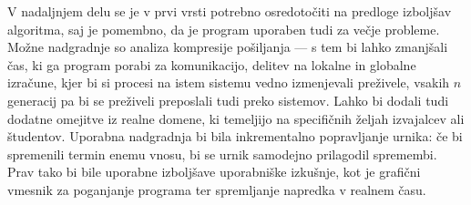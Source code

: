 \documentclass[a4paper,12pt]{book}
\begin{document}
V nadaljnjem delu se je v prvi vrsti potrebno osredotočiti na predloge izboljšav algoritma, saj je pomembno, da je program uporaben tudi za večje probleme. Možne nadgradnje so analiza kompresije pošiljanja --- s tem bi lahko zmanjšali čas, ki ga program porabi za komunikacijo, delitev na lokalne in globalne izračune, kjer bi si procesi na istem sistemu vedno izmenjevali preživele, vsakih $n$ generacij pa bi se preživeli preposlali tudi preko sistemov. Lahko bi dodali tudi dodatne omejitve iz realne domene, ki temeljijo na specifičnih željah izvajalcev ali študentov. Uporabna nadgradnja bi bila inkrementalno popravljanje urnika: če bi spremenili termin enemu vnosu, bi se urnik samodejno prilagodil spremembi. Prav tako bi bile uporabne izboljšave uporabniške izkušnje, kot je grafični vmesnik za poganjanje programa ter spremljanje napredka v realnem času. 




\end{document}
